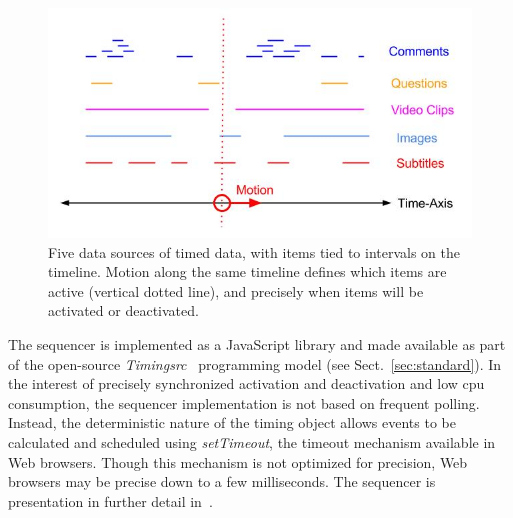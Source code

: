 \begin{figure}[h]
\centering
\includegraphics[scale=.4]{fig/sequencer.jpg}
\caption{Five data sources of timed data, with items tied to intervals on the timeline. Motion along the same timeline defines which items are active (vertical dotted line), and precisely when items will be activated or deactivated.}
\label{fig:sequencer}
\end{figure}



The sequencer is implemented as a JavaScript library and made available as
part of the open-source \emph{Timingsrc}~\cite{timingsrc} programming model
(see Sect.~\ref{sec:standard}). In the interest of precisely synchronized
activation and deactivation and low cpu consumption, the sequencer
implementation is not based on frequent polling. Instead, the deterministic
nature of the timing object allows events to be calculated and scheduled using
\emph{setTimeout}, the timeout mechanism available in Web browsers. Though
this mechanism is not optimized for precision, Web browsers may be precise
down to a few milliseconds. The sequencer is presentation in further detail in~\cite{sequencer}.






